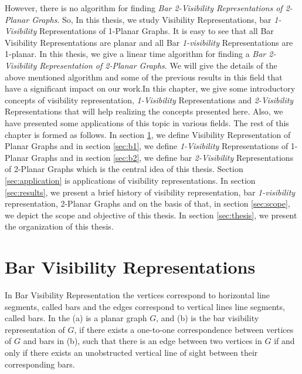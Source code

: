 However, there is no algorithm for finding  \emph{Bar 2-Visibility Representations of 2-Planar Graphs}. So, In this thesis, we study Visibility Representations, bar \emph{1-Visibility} Representations of 1-Planar Graphs. It is easy to see that all Bar Visibility Representations are planar and all Bar \emph{1-visibility} Representations are 1-planar. In this thesis, we give a linear time algorithm for finding a \emph{ Bar 2-Visibility Representation of 2-Planar Graphs}. We will give the details of the above mentioned algorithm and some of the previous results in this field that have a significant impact on our work.In this chapter, we give some introductory concepts of visibility representation, \emph{1-Visibility} Representations and \emph{2-Visibility} Representations that will help realizing the concepts presented here. Also, we have presented some applications of this topic in various fields. The rest of this chapter is formed as follows. In section \ref{sec:bbr}, we define Visibility Representation of Planar Graphs and in section \ref{sec:b1}, we define \emph{1-Visibility} Representations of 1-Planar Graphs and  in section \ref{sec:b2}, we define bar \emph{2-Visibility} Representations of 2-Planar Graphs which is the central idea of this thesis. Section \ref{sec:application} is applications of visibility representations. In section \ref{sec:results}, we present a brief history of visibility representation, bar \emph{1-visibility} representation, 2-Planar Graphs and on the basis of that, in section \ref{sec:scope}, we depict the scope and objective of this thesis. In section  \ref{sec:thesis}, we present the organization of this thesis.









\section{Bar Visibility Representations}
\label{sec:bbr}
In Bar Visibility Representation \cite{R} the vertices correspond to horizontal line segments, called bars and the edges correspond to vertical lines line segments, called bars.
In the  (a) is a planar graph $G$, and (b) is the bar visibility representation of $G$, if there exists a one-to-one correspondence between vertices of $G$ and bars in (b), such that there is an edge between two vertices in $G$ if and only if there exists an unobstructed vertical line of sight between their corresponding bars. 


